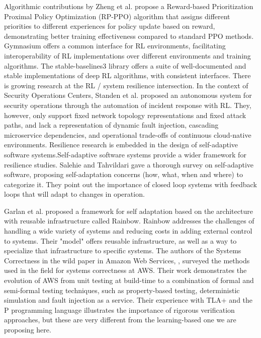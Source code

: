 \documentclass[pdflatex,sn-mathphys-num]{sn-jnl}%
\theoremstyle{thmstyleone}%
\theoremstyle{thmstyletwo}%
\theoremstyle{thmstylethree}%
\begin{document}
	Algorithmic contributions by Zheng et al. \cite{zheng2025proximal} propose a Reward-based Prioritization Proximal Policy Optimization (RP-PPO) algorithm that assigns different priorities to different experiences for policy update based on reward, demonstrating better training effectiveness compared to standard PPO methods. Gymnasium \cite{towers2026gymnasium} offers a common interface for RL environments, facilitating interoperability of RL implementations over different environments and training algorithms. The stable-baselines3 library \cite{raffin2021stable} offers a suite of well-documented and stable implementations of deep RL algorithms, with consistent interfaces. 	There is growing research at the RL / system resilience intersection. In the context of Security Operations Centers, Standen et al. \cite{standen2021cyborg} proposed an autonomous system for security operations through the automation of incident response with RL. They, however, only support fixed network topology representations and fixed attack paths, and lack a representation of dynamic fault injection, cascading microservice dependencies, and operational trade-offs of continuous cloud-native environments. Resilience research is embedded in the design of self-adaptive software systems.Self-adaptive software systems provide a wider framework for resilience studies. Salehie and Tahvildari \cite{salehie2009self} gave a thorough survey on self-adaptive software, proposing self-adaptation concerns (how, what, when and where) to categorize it. They point out the importance of closed loop systems with feedback loops that will adapt to changes in operation.
	
	Garlan et al. \cite{garlan2004rainbow} proposed a framework for self adaptation based on the architecture with reusable infrastructure called Rainbow. Rainbow addresses the challenges of handling a wide variety of systems and reducing costs in adding external control to systems. Their "model" offers reusable infrastructure, as well as a way to specialize that infrastructure to specific systems. The authors of the Systems Correctness in the wild paper in Amazon Web Services, \cite{brooker2025systems}, surveyed the methods used in the field for systems correctness at AWS. Their work demonstrates the evolution of AWS from unit testing at build-time to a combination of formal and semi-formal testing techniques, such as property-based testing, deterministic simulation and fault injection as a service. Their experience with TLA+ and the P programming language illustrates the importance of rigorous verification approaches, but these are very different from the learning-based one we are proposing here.
	
\end{document}
